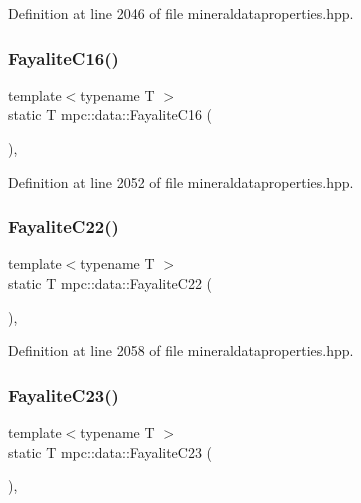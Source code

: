 Definition at line 2046 of file mineraldataproperties.\+hpp.

\mbox{\label{namespacempc_1_1data_a590d59299dd0b06d9c615e6cc28521e4}} 
\subsubsection{\texorpdfstring{Fayalite\+C16()}{FayaliteC16()}}
{\footnotesize\ttfamily template$<$typename T $>$ \\
static T mpc\+::data\+::\+Fayalite\+C16 (\begin{DoxyParamCaption}{ }\end{DoxyParamCaption})\hspace{0.3cm}{\ttfamily [inline]}, {\ttfamily [static]}}



Definition at line 2052 of file mineraldataproperties.\+hpp.

\mbox{\label{namespacempc_1_1data_a8d4b0f4d2f96f186aae8a37e45a80d99}} 
\subsubsection{\texorpdfstring{Fayalite\+C22()}{FayaliteC22()}}
{\footnotesize\ttfamily template$<$typename T $>$ \\
static T mpc\+::data\+::\+Fayalite\+C22 (\begin{DoxyParamCaption}{ }\end{DoxyParamCaption})\hspace{0.3cm}{\ttfamily [inline]}, {\ttfamily [static]}}



Definition at line 2058 of file mineraldataproperties.\+hpp.

\mbox{\label{namespacempc_1_1data_a35efede00744fbddccf14174e597091a}} 
\subsubsection{\texorpdfstring{Fayalite\+C23()}{FayaliteC23()}}
{\footnotesize\ttfamily template$<$typename T $>$ \\
static T mpc\+::data\+::\+Fayalite\+C23 (\begin{DoxyParamCaption}{ }\end{DoxyParamCaption})\hspace{0.3cm}{\ttfamily [inline]}, {\ttfamily [static]}}



